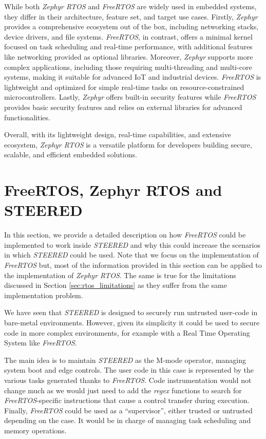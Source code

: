 While both \textit{Zephyr RTOS} and \textit{FreeRTOS} are widely used in embedded
systems, they differ in their architecture, feature set, and target use cases. Firstly,
\textit{Zephyr} provides a comprehensive ecosystem out of the box, including
networking stacks, device drivers, and file systems. \textit{FreeRTOS}, in contrast,
offers a minimal kernel focused on task scheduling and real-time performance, with
additional features like networking provided as optional libraries. Moreover, \textit{Zephyr}
supports more complex applications, including those requiring multi-threading and
multi-core systems, making it suitable for advanced IoT and industrial devices. \textit{FreeRTOS}
is lightweight and optimized for simple real-time tasks on resource-constrained
microcontrollers. Lastly, \textit{Zephyr} offers built-in security features while
\textit{FreeRTOS} provides basic security features and relies on external
libraries for advanced functionalities.

Overall, with its lightweight design, real-time capabilities, and extensive ecosystem,
\textit{Zephyr RTOS} is a versatile platform for developers building secure,
scalable, and efficient embedded solutions.

\section{FreeRTOS, Zephyr RTOS and STEERED}
\label{sec:rtos_porting}

In this section, we provide a detailed description on how \textit{FreeRTOS}
could be implemented to work inside \textit{STEERED} and why this could increase
the scenarios in which \textit{STEERED} could be used. Note that we focus on the
implementation of \textit{FreeRTOS} but, most of the information provided in this
section can be applied to the implementation of \textit{Zephyr RTOS}. The same is
true for the limitations discussed in Section \ref{sec:rtos_limitations} as they
suffer from the same implementation problem.

We have seen that \textit{STEERED} is designed to securely run untrusted user-code
in bare-metal environments. However, given its simplicity it could be used to
secure code in more complex environments, for example with a Real Time Operating
System like \textit{FreeRTOS}.

The main idea is to maintain \textit{STEERED} as the M-mode operator, managing
system boot and edge controls. The user code in this case is represented by the various
tasks generated thanks to \textit{FreeRTOS}. Code instrumentation would not change
much as we would just need to add the \textit{regex} functions to search for
\textit{FreeRTOS}-specific instructions that cause a control transfer during execution.
Finally, \textit{FreeRTOS} could be used as a ``supervisor'', either trusted or untrusted
depending on the case. It would be in charge of managing task scheduling and
memory operations.

